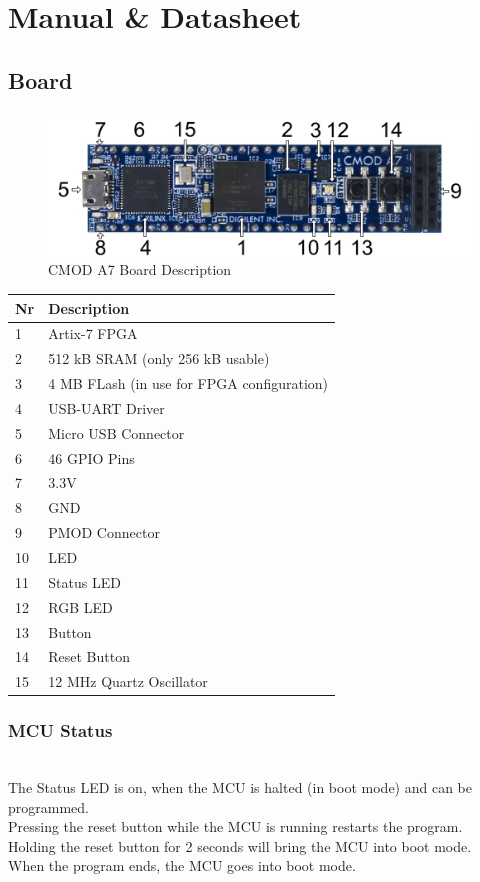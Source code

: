 \section{Manual \& Datasheet}

\subsection{Board}
\begin{figure}[h]
    \begin{center} 
        \includegraphics{assets/cmod a7.png}
    \end{center}
    \caption{CMOD A7 Board Description \cite{cmod-a7-topdown}}
\end{figure}
\begin{tabular}{l|l}
    Nr & Description \\ \hline
    1 & Artix-7 FPGA \\
    2 & 512 kB SRAM (only 256 kB usable) \\
    3 & 4 MB FLash (in use for FPGA configuration) \\
    4 & USB-UART Driver \\
    5 & Micro USB Connector \\
    6 & 46 GPIO Pins \\
    7 & 3.3V \\
    8 & GND \\
    9 & PMOD Connector \\
    10 & LED \\
    11 & Status LED \\
    12 & RGB LED \\
    13 & Button \\
    14 & Reset Button \\
    15 & 12 MHz Quartz Oscillator \\
\end{tabular}   

\subsubsection{MCU Status}~\\
The Status LED is on, when the MCU is halted (in boot mode) and can be programmed. \\
Pressing the reset button while the MCU is running restarts the program. \\
Holding the reset button for 2 seconds will bring the MCU into boot mode.\\
When the program ends, the MCU goes into boot mode.
\newpage


